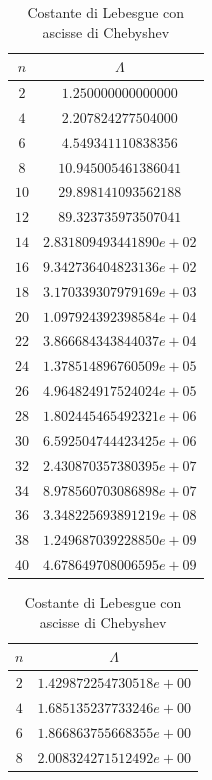 \begin{table}[H]
	\begin{minipage}{0.5\textwidth}
		\centering
		\caption{Costante di Lebesgue con ascisse equispaziate}
		\begin{tabular}{|c|c|}
			\hline
			$n$ & $\Lambda$ \\
			\hline
			$2$  & $1.250000000000000$ \\ 
			$4$  & $2.207824277504000$ \\ 
			$6$  & $4.549341110838356$ \\ 
			$8$  & $10.945005461386041$ \\ 
			$10$ & $29.898141093562188$ \\ 
			$12$ & $89.323735973507041$ \\ 
			$14$ & $2.831809493441890e+02$ \\ 
			$16$ & $9.342736404823136e+02$ \\ 
			$18$ & $3.170339307979169e+03$ \\ 
			$20$ & $1.097924392398584e+04$ \\ 
			$22$ & $3.866684343844037e+04$ \\ 
			$24$ & $1.378514896760509e+05$ \\ 
			$26$ & $4.964824917524024e+05$ \\ 
			$28$ & $1.802445465492321e+06$ \\ 
			$30$ & $6.592504744423425e+06$ \\ 
			$32$ & $2.430870357380395e+07$ \\ 
			$34$ & $8.978560703086898e+07$ \\ 
			$36$ & $3.348225693891219e+08$ \\ 
			$38$ & $1.249687039228850e+09$ \\ 
			$40$ & $4.678649708006595e+09$ \\ 
			\hline
		\end{tabular}
	\end{minipage}
	\hspace*{\fill}
	\begin{minipage}{0.5\textwidth}
		\centering
		\caption{Costante di Lebesgue con ascisse di Chebyshev}
		\begin{tabular}{|c|c|}
			\hline
			$n$ & $\Lambda$ \\
			\hline
			$2$  & $1.429872254730518e+00$ \\ 
			$4$  & $1.685135237733246e+00$ \\ 
			$6$  & $1.866863755668355e+00$ \\ 
			$8$  & $2.008324271512492e+00$ \\ 

\end{tabular}
\end{minipage}
\end{table}
